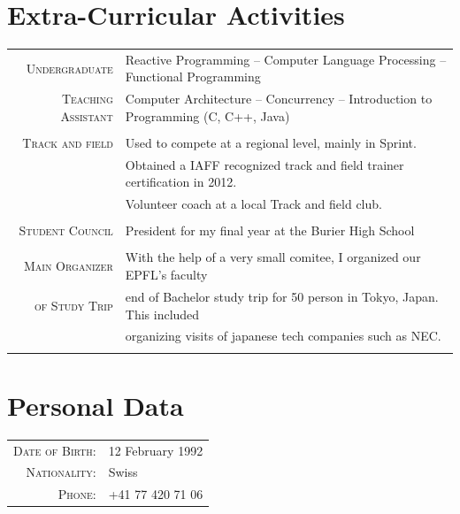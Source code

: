\documentclass[a4paper,11pt]{article} %
\begin{document}
\section{Extra-Curricular Activities}
\begin{tabular}{rl}
\textsc{\large{Undergraduate}} &
Reactive Programming --
Computer Language Processing -- Functional Programming \\
\textsc{\large{Teaching Assistant}} &
Computer Architecture -- Concurrency -- Introduction to Programming (C, C++, Java) \\
\multicolumn{2}{c}{} \\

\textsc{\large{Track and field}} &
Used to compete at a regional level, mainly in Sprint.\\
& Obtained a IAFF recognized track and field trainer certification in 2012. \\
& Volunteer coach at a local Track and field club.\\
\multicolumn{2}{c}{} \\

\textsc{\large{Student Council}} &
President for my final year at the Burier High School \\
\multicolumn{2}{c}{} \\

\textsc{\large{Main Organizer}} & With the help of a very small comitee, I organized our EPFL's faculty\\
\textsc{\large{of Study Trip}} & end of Bachelor study trip for 50 person in Tokyo, Japan. This included\\
    & organizing visits of japanese tech companies such as NEC.\\
\multicolumn{2}{c}{} \\

\end{tabular}


\section{Personal Data}
\begin{center}
\begin{tabular}{rl}
\textsc{Date of Birth:} & 12 February 1992 \\
\textsc{Nationality:} & Swiss \\
\textsc{Phone:} & +41 77 420 71 06\\
\end{tabular}
\end{center}
\end{document}
